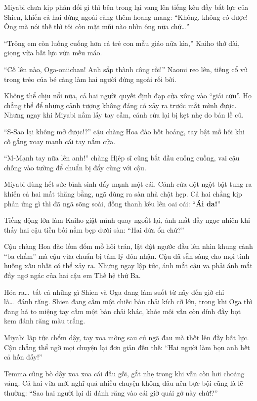 \documentclass[../main.tex]{subfiles}
\begin{document}
Miyabi chưa kịp phản đối gì thì bên trong lại vang lên tiếng kêu đầy bất lực của Shien, khiến cả hai đứng ngoài càng thêm hoang mang: ``Không, không có được! Ông mà nói thế thì tôi còn mặt mũi nào nhìn ông nữa chứ\dots''

``Trông em còn luống cuống hơn cả trẻ con mẫu giáo nữa kìa,'' Kaiho thở dài, giọng vừa bất lực vừa mếu máo.

``Cố lên nào, Oga-oniichan! Anh sắp thành công rồi!'' Naomi reo lên, tiếng cổ vũ trong trẻo của bé càng làm hai người đứng ngoài rối bời.

Không thể chịu nổi nữa, cả hai người quyết định đạp cửa xông vào ``giải cứu''. Họ chẳng thể để những cảnh tượng không đáng có xảy ra trước mắt mình được. Nhưng ngay khi Miyabi nắm lấy tay cầm, cánh cửa lại bị kẹt nhẹ do bản lề cũ.

``S-Sao lại không mở được!?'' cậu chàng Hoa đào hốt hoảng, tay bật mồ hôi khi cố gắng xoay mạnh cái tay nắm cửa.

``M-Mạnh tay nữa lên anh!'' chàng Hịêp sĩ cũng bắt đầu cuống cuồng, vai cậu chống vào tường để chuẩn bị đẩy cùng với cậu.

Miyabi dùng hết sức bình sinh đẩy mạnh một cái. Cánh cửa đột ngột bật tung ra khiến cả hai mất thăng bằng, ngã đùng ra sàn nhà chật hẹp. Cả hai chẳng kịp phản ứng gì thì đã ngã sõng soài, đồng thanh kêu lên oai oái: ``\textbf{Ái da!}''

Tiếng động lớn làm Kaiho giật mình quay ngoắt lại, ánh mắt đầy ngạc nhiên khi thấy hai cậu tiền bối nằm bẹp dưới sàn: ``Hai đứa ổn chứ?''

Cậu chàng Hoa đào lốm đốm mồ hôi trán, lật đật ngước đầu lên nhìn khung cảnh ``ba chấm'' mà cậu vừa chuẩn bị tâm lý đón nhận. Cậu đã sẵn sàng cho mọi tình huống xấu nhất có thể xảy ra. Nhưng ngay lập tức, ánh mắt cậu va phải ánh mắt đầy ngơ ngác của hai cậu em Thế hệ thứ Ba.

Hóa ra\dots\ tất cả những gì Shien và Oga đang làm suốt từ nãy đến giờ chỉ là\dots\ đánh răng. Shien đang cầm một chiếc bàn chải kích cỡ lớn, trong khi Oga thì đang há to miệng tay cầm một bàn chải khác, khóe môi vẫn còn dính đầy bọt kem đánh răng màu trắng.


Miyabi lập tức chổm dậy, tay xoa mông sau cú ngã đau mà thốt lên đầy bất lực. Cậu chẳng thể ngờ mọi chuyện lại đơn giản đến thế: ``Hai người làm bọn anh hết cả hồn đấy!''

Temma cũng bò dậy xoa xoa cái đầu gối, gắt nhẹ trong khi vẫn còn hơi choáng váng. Cả hai vừa mới nghĩ quá nhiều chuyện không đâu nên bực bội cũng là lẽ thường: ``Sao hai người lại đi đánh răng vào cái giờ quái gở này chứ!?''
\end{document}
